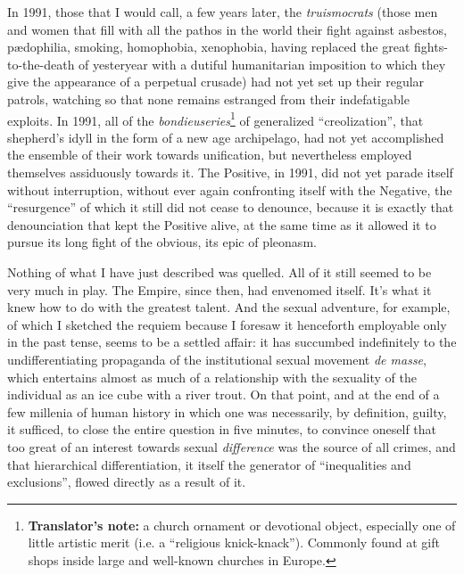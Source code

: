 In 1991, those that I would call, a few years later, the \textit{truismocrats} (those men and women that fill with all the pathos in the world their fight against asbestos, p{\ae}dophilia, smoking, homophobia, xenophobia, having replaced the great fights-to-the-death of yesteryear with a dutiful humanitarian imposition to which they give the appearance of a perpetual crusade) had not yet set up their regular patrols, watching so that none remains estranged from their indefatigable exploits. In 1991, all of the \textit{bondieuseries}\footnote{\textbf{Translator's note:} a church ornament or devotional object, especially one of little artistic merit (i.e. a ``religious knick-knack''). Commonly found at gift shops inside large and well-known churches in Europe.} of generalized ``creolization'', that shepherd's idyll in the form of a new age archipelago, had not yet accomplished the ensemble of their work towards unification, but nevertheless employed themselves assiduously towards it. The Positive, in 1991, did not yet parade itself without interruption, without ever again confronting itself with the Negative, the ``resurgence'' of which it still did not cease to denounce, because it is exactly that denounciation that kept the Positive alive, at the same time as it allowed it to pursue its long fight of the obvious, its epic of pleonasm.

Nothing of what I have just described was quelled. All of it still seemed to be very much in play. The Empire, since then, had envenomed itself. It's what it knew how to do with the greatest talent. And the sexual adventure, for example, of which I sketched the requiem because I foresaw it henceforth employable only in the past tense, seems to be a settled affair: it has succumbed indefinitely to the undifferentiating propaganda of the institutional sexual movement \textit{de masse}, which entertains almost as much of a relationship with the sexuality of the individual as an ice cube with a river trout. On that point, and at the end of a few millenia of human history in which one was necessarily, by definition, guilty, it sufficed, to close the entire question in five minutes, to convince oneself that too great of an interest towards sexual \textit{difference} was the source of all crimes, and that hierarchical differentiation, it itself the generator of ``inequalities and exclusions'', flowed directly as a result of it.

